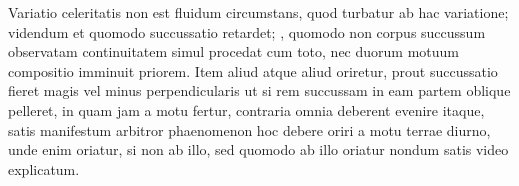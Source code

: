  Variatio celeritatis non est  fluidum circumstans, quod turbatur ab hac variatione; videndum et quomodo succussatio retardet; , quomodo non corpus succussum observatam continuitatem simul procedat cum toto, nec duorum motuum compositio imminuit priorem. Item aliud atque aliud oriretur, prout succussatio fieret magis vel minus perpendicularis ut si rem succussam in eam partem oblique pelleret, in quam jam a motu fertur, contraria omnia deberent evenire itaque, satis manifestum arbitror phaenomenon hoc debere oriri a motu terrae diurno, unde enim oriatur, si non ab illo, sed quomodo ab illo oriatur nondum satis video explicatum.
\pend
\count{}
            \count{}
 


